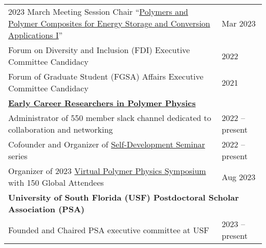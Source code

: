\documentclass[letterpaper,11pt]{article}
\begin{document}
\begin{longtable}{@{}p{}l@{}}
  \hspace{3mm} 2023 March Meeting Session Chair ``\href{https://meetings.aps.org/Meeting/MAR23/Session/Y15}{Polymers and Polymer Composites for Energy Storage and Conversion Applications I}''                   & Mar 2023         \\
  \hspace{3mm} Forum on Diversity and Inclusion (FDI) Executive Committee Candidacy                                                                                                                               & 2022             \\
  \hspace{3mm} Forum of Graduate Student (FGSA) Affairs Executive Committee Candidacy                                                                                                                             & 2021             \\ [4pt]
  \multicolumn{2}{l}{\hspace{-3mm} \bf{\href{https://sites.google.com/view/polymerphysics/}{Early Career Researchers in Polymer Physics}}}                                                                                           \\
  \hspace{3mm} Administrator of 550 member slack channel dedicated to collaboration and networking                                                                                                                & 2022 -- present  \\
  \hspace{3mm} Cofounder and Organizer of \href{https://sites.google.com/view/polymerphysics/self-dev-seminars}{Self-Development Seminar} series                                                                  & 2022 -- present  \\
  \hspace{3mm} Organizer of 2023 \href{https://sites.google.com/view/polymerphysics/vpps-2023-schedule}{Virtual Polymer Physics Symposium} with 150 Global Attendees                                              & Aug 2023         \\ [4pt]
  \multicolumn{2}{l}{\hspace{-3mm} \bf{University of South Florida (USF) Postdoctoral Scholar Association (PSA)}}                                                                                                                    \\
  \hspace{3mm} Founded and Chaired PSA executive committee at USF                                                                                                                                                 & 2023 -- present  \\

\end{longtable}
\end{document}
